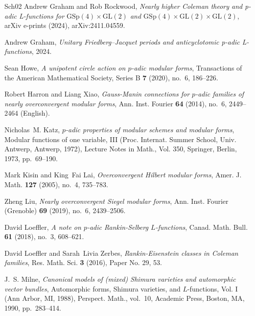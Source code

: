 \documentclass[10pt, oneside]{amsart}
\numberwithin{equation}{subsection}
\theoremstyle{definition}
\theoremstyle{remark}
\begin{document}
\begin{thebibliography}{{Sch}02}
Andrew {Graham} and Rob {Rockwood}, \emph{{{N}early higher Coleman theory and
  p-adic L-functions for $\mathrm{GSp}(4) \times \mathrm{GL}(2)$ and
  $\mathrm{GSp}(4) \times \mathrm{GL}(2) \times \mathrm{GL}(2)$}}, arXiv
  e-prints (2024), arXiv:2411.04559.

Andrew Graham, \emph{{U}nitary {F}riedberg--{J}acquet periods and
  anticyclotomic p-adic {L}-functions}, 2024.

Sean Howe, \emph{A unipotent circle action on {$p$}-adic modular forms},
  Transactions of the American Mathematical Society, Series B \textbf{7}
  (2020), no.~6, 186--226.

Robert Harron and Liang Xiao, \emph{Gauss-{Manin} connections for
  {{\(p\)}}-adic families of nearly overconvergent modular forms}, Ann. Inst.
  Fourier \textbf{64} (2014), no.~6, 2449--2464 (English).

Nicholas~M. Katz, \emph{{$p$}-adic properties of modular schemes and modular
  forms}, Modular functions of one variable, {III} ({P}roc. {I}nternat.
  {S}ummer {S}chool, {U}niv. {A}ntwerp, {A}ntwerp, 1972), Lecture Notes in
  Math., Vol. 350, Springer, Berlin, 1973, pp.~69--190.

Mark Kisin and King~Fai Lai, \emph{Overconvergent {H}ilbert modular forms},
  Amer. J. Math. \textbf{127} (2005), no.~4, 735--783. 

Zheng Liu, \emph{Nearly overconvergent {S}iegel modular forms}, Ann. Inst.
  Fourier (Grenoble) \textbf{69} (2019), no.~6, 2439--2506. 

David Loeffler, \emph{A note on {$p$}-adic {R}ankin-{S}elberg {$L$}-functions},
  Canad. Math. Bull. \textbf{61} (2018), no.~3, 608--621. 

David Loeffler and Sarah~Livia Zerbes, \emph{Rankin-{E}isenstein classes in
  {C}oleman families}, Res. Math. Sci. \textbf{3} (2016), Paper No. 29, 53.

J.~S. Milne, \emph{Canonical models of (mixed) {S}himura varieties and
  automorphic vector bundles}, Automorphic forms, {S}himura varieties, and
  {$L$}-functions, {V}ol. {I} ({A}nn {A}rbor, {MI}, 1988), Perspect. Math.,
  vol.~10, Academic Press, Boston, MA, 1990, pp.~283--414. 


\end{thebibliography}
\end{document}
